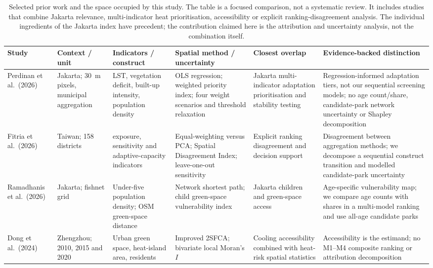\begin{table}[htbp]
\centering
\footnotesize
\caption{Selected prior work and the space occupied by this study. The table is a
focused comparison, not a systematic review. It includes studies that combine
Jakarta relevance, multi-indicator heat prioritisation, accessibility or explicit
ranking-disagreement analysis. The individual ingredients of the Jakarta index
have precedent; the contribution claimed here is the attribution and uncertainty
analysis, not the combination itself.}
\label{tab:literature}
\begin{threeparttable}
\begin{tabularx}{\textwidth}{@{}>{\raggedright\arraybackslash}p{2.35cm}
>{\raggedright\arraybackslash}p{2.45cm}
>{\raggedright\arraybackslash}p{2.65cm}
>{\raggedright\arraybackslash}p{2.55cm}
>{\raggedright\arraybackslash}p{2.25cm}
>{\raggedright\arraybackslash}X@{}}
\toprule
Study & Context / unit & Indicators / construct & Spatial method / uncertainty & Closest overlap & Evidence-backed distinction \\
\midrule
Perdinan et al.\ (2026) & Jakarta; 30~m pixels, municipal aggregation & LST, vegetation deficit, built-up intensity, population density & OLS regression; weighted priority index; four weight scenarios and threshold relaxation & Jakarta multi-indicator adaptation prioritisation and stability testing & Regression-informed adaptation tiers, not our sequential screening models; no age count/share, candidate-park network uncertainty or Shapley decomposition \\
Fitria et al.\ (2026) & Taiwan; 158 districts & 17 exposure, sensitivity and adaptive-capacity indicators & Equal-weighting versus PCA; Spatial Disagreement Index; leave-one-out sensitivity & Explicit ranking disagreement and decision support & Disagreement between aggregation methods; we decompose a sequential construct transition and modelled candidate-park uncertainty \\
Ramadhanis et al.\ (2026) & Jakarta; fishnet grid & Under-five population density; OSM green-space distance & Network shortest path; child green-space vulnerability index & Jakarta children and green-space access & Age-specific vulnerability map; we compare age counts with shares in a multi-model ranking and use all-age candidate parks \\
Dong et al.\ (2024) & Zhengzhou; 2010, 2015 and 2020 & Urban green space, heat-island area, residents & Improved 2SFCA; bivariate local Moran's $I$ & Cooling accessibility combined with heat-risk spatial statistics & Accessibility is the estimand; no M1--M4 composite ranking or attribution decomposition \\

\end{tabularx}
\end{threeparttable}
\end{table}

